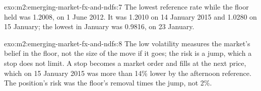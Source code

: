 \begin{solution}{exo:m2:emerging-market-fx-and-ndfs:7}
The lowest reference rate while the floor held was 1.2008, on 1 June 2012. It was
1.2010 on 14 January 2015 and 1.0280 on 15 January; the lowest in January was
0.9816, on 23 January.
\end{solution}

\begin{solution}{exo:m2:emerging-market-fx-and-ndfs:8}
The low volatility measures the market's belief in the floor, not the size of
the move if it goes; the risk is a jump, which a stop does not limit. A stop
becomes a market order and fills at the next price, which on 15 January 2015 was
more than 14\% lower by the afternoon reference. The position's risk was the
floor's removal times the jump, not 2\%.
\end{solution}

